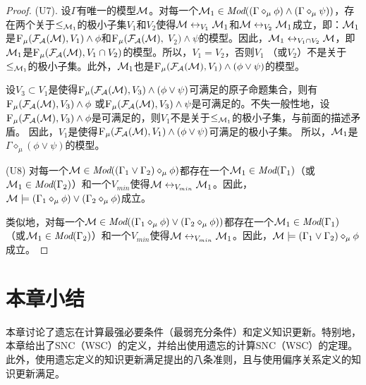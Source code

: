 \begin{proof}
	
	(U7). 设$\Gamma$有唯一的模型${\cal M}$。对每一个${\cal M}_1 \in \textit{Mod}((\Gamma \diamond_{\mu} \phi) \wedge (\Gamma \diamond_{\mu} \psi))$，存在两个关于$\leq_{{\cal M}_1}$的极小子集$V_1$和$V_2$使得${\cal M} \leftrightarrow_{V_1} {\cal M}_1$和${\cal M} \leftrightarrow_{V_2} {\cal M}_1$成立，即：${\cal M}_1$是${\textsc{F}_{\textsc{$\mu$}}}({\cal F}_{{\cal A}}({\cal M}), V_1) \wedge \phi$和${\textsc{F}_{\textsc{$\mu$}}}({\cal F}_{{\cal A}}({\cal M}),$ $V_2) \wedge \psi$的模型。因此，${\cal M}_1 \leftrightarrow_{V_1 \cap V_2} {\cal M}$，即${\cal M}_1$是${\textsc{F}_{\textsc{$\mu$}}}({\cal F}_{{\cal A}}({\cal M}), V_1 \cap V_2)$的模型。所以，$V_1 = V_2$，否则$V_1$ （或$V_2$）不是关于$\leq_{{\cal M}_1}$的极小子集。此外，${\cal M}_1$也是${\textsc{F}_{\textsc{$\mu$}}}({\cal F}_{{\cal A}}({\cal M}), V_1) \wedge (\phi \vee \psi)$的模型。
	
	设$V_3\subset V_1$是使得${\textsc{F}_{\textsc{$\mu$}}}({\cal F}_{{\cal A}}({\cal M}), V_3) \wedge (\phi \vee \psi)$可满足的原子命题集合，则有${\textsc{F}_{\textsc{$\mu$}}}({\cal F}_{{\cal A}}({\cal M}), V_3) \wedge \phi$ 或${\textsc{F}_{\textsc{$\mu$}}}({\cal F}_{{\cal A}}({\cal M}), V_3) \wedge \psi$是可满足的。不失一般性地，设${\textsc{F}_{\textsc{$\mu$}}}({\cal F}_{{\cal A}}({\cal M}), V_3) \wedge \phi$是可满足的，则$V_1$不是关于$\leq_{{\cal M}_1}$的极小子集，与前面的描述矛盾。
	因此，$V_1$是使得${\textsc{F}_{\textsc{$\mu$}}}({\cal F}_{{\cal A}}({\cal M}), V_1) \wedge (\phi \vee \psi)$可满足的极小子集。
	所以，${\cal M}_1$是$\Gamma \diamond_{\mu} (\phi \vee \psi)$的模型。
	
	(U8) 对每一个${\cal M} \in \textit{Mod}((\Gamma_1 \vee \Gamma_2) \diamond_{\mu} \phi)$都存在一个${\cal M}_1 \in \textit{Mod}(\Gamma_1)$（或${\cal M}_1\in \textit{Mod}(\Gamma_2)$）和一个$V_{min}$使得${\cal M} \leftrightarrow_{V_{min}} {\cal M}_1$。因此，${\cal M} \models  (\Gamma_1 \diamond_{\mu} \phi) \vee (\Gamma_2 \diamond_{\mu} \phi)$成立。
	
	类似地，对每一个${\cal M} \in \textit{Mod}( (\Gamma_1 \diamond_{\mu} \phi) \vee (\Gamma_2 \diamond_{\mu} \phi))$都存在一个${\cal M}_1\in \textit{Mod}(\Gamma_1)$ （或${\cal M}_1 \in \textit{Mod}(\Gamma_2)$）和一个$V_{min}$使得${\cal M} \leftrightarrow_{V_{min}} {\cal M}_1$。因此，${\cal M} \models (\Gamma_1 \vee \Gamma_2) \diamond_{\mu} \phi$成立。
\end{proof}

\section{本章小结}\label{sec:chapter07-conclusion}

本章讨论了遗忘在计算最强必要条件（最弱充分条件）和定义知识更新。特别地，本章给出了SNC（WSC）的定义，并给出使用遗忘的计算SNC（WSC）的定理。
此外，使用遗忘定义的知识更新满足\citeauthor{katsuno91mendelzon}提出的八条准则，且与使用偏序关系定义的知识更新满足。
